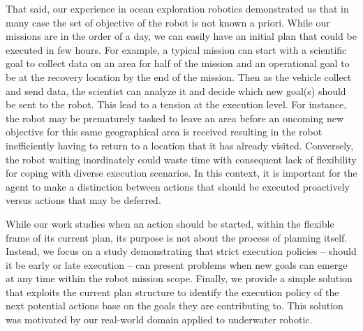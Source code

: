 That said, our experience in ocean exploration robotics demonstrated
us that in many case the set of objective of the robot is not known a
priori. While our missions are in the order of a day, we can easily
have an initial plan that could be executed in few hours. For example, 
a typical mission can start with a scientific goal to collect data on
an area for half of the mission and an operational goal to be at the
recovery location by the end of the mission. Then as the vehicle
collect and send data, the scientist can analyze it and decide which
new goal(s) should be sent to the robot. This lead to a tension at the
execution level.
 For instance, the robot may be prematurely tasked to leave an
area before an oncoming new objective for this same geographical area
is received resulting in the robot inefficiently having to return to a
location that it has already visited. Conversely, the robot waiting
inordinately could waste time with consequent lack of flexibility for
coping with diverse execution scenarios. In this context, it is
important for the agent to make a distinction between actions that should
be executed proactively versus actions that may be deferred. 


While our work studies when an action should be started, within the
flexible frame of its current plan, its purpose is not about the
process of planning itself. Instead, we focus on a study demonstrating
that strict execution policies -- should it be early or late execution
-- can present problems when new goals can emerge at any time within
the robot mission scope. Finally, we provide a simple solution that
exploits the current plan structure to identify the execution policy
of the next potential actions base on the goals they are contributing
to. This solution was motivated by our real-world domain applied to
underwater robotic.





